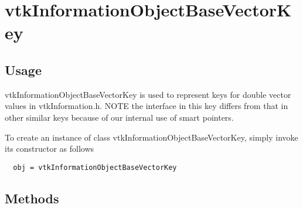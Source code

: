 \section{vtkInformationObjectBaseVectorKey}

\subsection{Usage}

 vtkInformationObjectBaseVectorKey is used to represent keys for double
 vector values in vtkInformation.h. NOTE the interface in this key differs
 from that in other similar keys because of our internal use of smart
 pointers.

To create an instance of class vtkInformationObjectBaseVectorKey, simply
invoke its constructor as follows
\begin{verbatim}
  obj = vtkInformationObjectBaseVectorKey
\end{verbatim}
\subsection{Methods}

